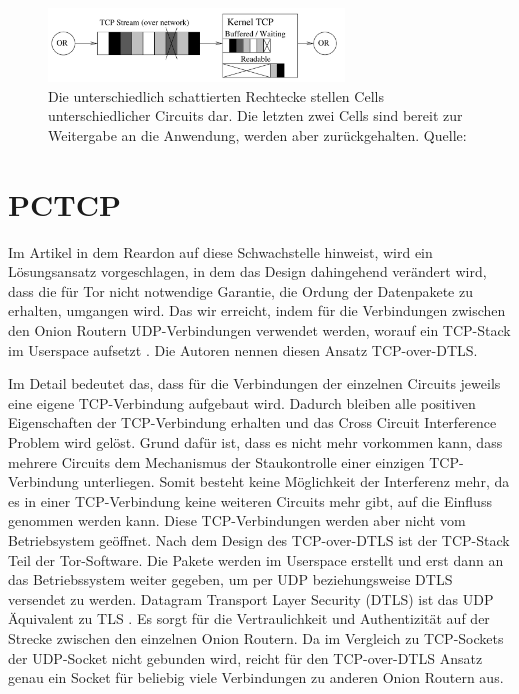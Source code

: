 \documentclass[fleqn,envcountsame,runningheads,10pt,a4paper]{llncs}
\begin{document}
\begin{figure}[ht]
  \begin{center}
    \includegraphics[width=0.7\textwidth]{pics/headonlinevanilla.pdf}
    \caption{Die unterschiedlich schattierten Rechtecke stellen Cells unterschiedlicher Circuits dar. Die letzten zwei Cells sind bereit zur Weitergabe an die Anwendung, werden aber zurückgehalten. Quelle: \cite{tcp-over-dtls}}
    \label{fig:headonline} 
  \end{center} 
\end{figure}

\section{PCTCP}\label{sec:pctcp}

Im Artikel in dem Reardon auf diese Schwachstelle hinweist, wird ein 
Lösungsansatz vorgeschlagen, in dem das Design dahingehend verändert wird, dass 
die für Tor nicht notwendige Garantie, die Ordung der Datenpakete zu erhalten, 
umgangen wird. Das wir erreicht, indem für die Verbindungen zwischen den Onion 
Routern UDP-Verbindungen verwendet werden, worauf ein TCP-Stack im Userspace 
aufsetzt \cite{tcp-over-dtls}. Die Autoren nennen diesen Ansatz TCP-over-DTLS.

Im Detail bedeutet das, dass für die Verbindungen der einzelnen Circuits jeweils 
eine eigene TCP-Verbindung aufgebaut wird. Dadurch bleiben alle positiven 
Eigenschaften der TCP-Verbindung erhalten und das Cross Circuit Interference 
Problem wird gelöst. Grund dafür ist, dass es nicht mehr vorkommen kann, dass 
mehrere Circuits dem Mechanismus der Staukontrolle einer einzigen TCP-Verbindung 
unterliegen. Somit besteht keine Möglichkeit der Interferenz mehr, da es in 
einer TCP-Verbindung keine weiteren Circuits mehr gibt, auf die Einfluss 
genommen werden kann. Diese TCP-Verbindungen werden aber nicht vom Betriebsystem 
geöffnet. Nach dem Design des TCP-over-DTLS ist der TCP-Stack Teil der 
Tor-Software. Die Pakete werden im Userspace erstellt und erst dann an das 
Betriebssystem weiter gegeben, um per UDP beziehungsweise DTLS versendet zu 
werden. Datagram Transport Layer Security (DTLS) ist das UDP Äquivalent zu TLS 
\cite{dtls}. Es sorgt für die Vertraulichkeit und Authentizität auf der Strecke 
zwischen den einzelnen Onion Routern. Da im Vergleich zu TCP-Sockets der 
UDP-Socket nicht gebunden wird, reicht für den TCP-over-DTLS Ansatz genau ein 
Socket für beliebig viele Verbindungen zu anderen Onion Routern aus.
\end{document}
